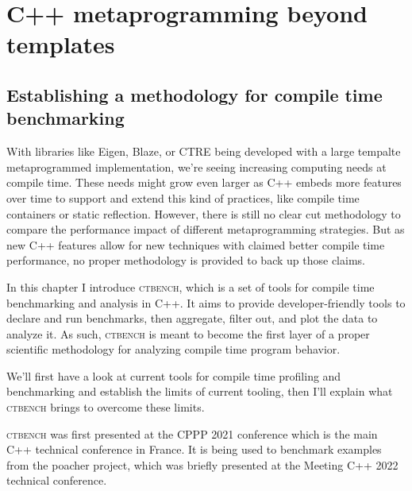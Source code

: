 \documentclass[english,12pt,a4paper]{book}
\providecommand{\cpp}{\textsc{C++}\xspace}
\providecommand{\ctbench}{\textsc{ctbench}\xspace}
\begin{document}


\part{C++ metaprogramming beyond templates}

\chapter{
  Establishing a methodology for compile time benchmarking
}

With libraries like Eigen\cite{eigen}, Blaze\cite{blazelib}, or CTRE\cite{ctre}
being developed with a large tempalte metaprogrammed implementation,
we're seeing increasing computing needs at compile time. These needs might grow
even larger as \cpp embeds more features over time to support and extend this
kind of practices, like compile time containers\cite{more-constexpr-containers}
or static reflection\cite{static-reflection}. However, there is still no clear
cut methodology to compare the performance impact of different metaprogramming
strategies. But as new \cpp features allow for new techniques with claimed
better compile time performance, no proper methodology is provided to back up
those claims.

In this chapter I introduce \ctbench, which is a set of tools for compile time
benchmarking and analysis in \cpp. It aims to provide developer-friendly tools
to declare and run benchmarks, then aggregate, filter out, and plot the data to
analyze it. As such, \ctbench is meant to become the first layer of a proper
scientific methodology for analyzing compile time program behavior.

We'll first have a look at current tools for compile time profiling and
benchmarking and establish the limits of current tooling, then I'll explain
what \ctbench brings to overcome these limits.

\ctbench was first presented at the CPPP 2021 conference\cite{ctbench-cppp21}
which is the main \cpp technical conference in France. It is being used to
benchmark examples from the poacher\cite{poacher} project, which was briefly
presented at the Meeting \cpp 2022\cite{meetingcpp22} technical conference.


% 


\end{document}
